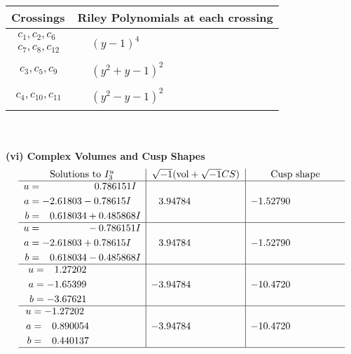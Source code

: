 \documentclass[1p]{elsarticle_modified}
\theoremstyle{definition}
\newcommand{\I}{\sqrt{-1}}
\begin{document}
\begin{tabular}{m{50pt}|m{274pt}}
Crossings & \hspace{64pt}Riley Polynomials at each crossing \\
\hline $$\begin{aligned}c_{1},c_{2},c_{6}\\c_{7},c_{8},c_{12}\end{aligned}$$&$\begin{aligned}
&(y-1)^4
\end{aligned}$\\
\hline $$\begin{aligned}c_{3},c_{5},c_{9}\end{aligned}$$&$\begin{aligned}
&(y^2+y-1)^2
\end{aligned}$\\
\hline $$\begin{aligned}c_{4},c_{10},c_{11}\end{aligned}$$&$\begin{aligned}
&(y^2- y-1)^2
\end{aligned}$\\
\hline
\end{tabular}\\~\\
\newpage\flushleft \textbf{(vi) Complex Volumes and Cusp Shapes}
$$\begin{array}{c|c|c}  
\text{Solutions to }I^u_{3}& \I (\text{vol} + \sqrt{-1}CS) & \text{Cusp shape}\\
 \hline 
\begin{aligned}
u &= \phantom{-0.000000 -}0.786151 I \\
a &= -2.61803 - 0.78615 I \\
b &= \phantom{-}0.618034 + 0.485868 I\end{aligned}
 & \phantom{-}3.94784\phantom{ +0.000000I} & -1.52790\phantom{ +0.000000I} \\ \hline\begin{aligned}
u &= \phantom{-0.000000 } -0.786151 I \\
a &= -2.61803 + 0.78615 I \\
b &= \phantom{-}0.618034 - 0.485868 I\end{aligned}
 & \phantom{-}3.94784\phantom{ +0.000000I} & -1.52790\phantom{ +0.000000I} \\ \hline\begin{aligned}
u &= \phantom{-}1.27202\phantom{ +0.000000I} \\
a &= -1.65399\phantom{ +0.000000I} \\
b &= -3.67621\phantom{ +0.000000I}\end{aligned}
 & -3.94784\phantom{ +0.000000I} & -10.4720\phantom{ +0.000000I} \\ \hline\begin{aligned}
u &= -1.27202\phantom{ +0.000000I} \\
a &= \phantom{-}0.890054\phantom{ +0.000000I} \\
b &= \phantom{-}0.440137\phantom{ +0.000000I}\end{aligned}
 & -3.94784\phantom{ +0.000000I} & -10.4720\phantom{ +0.000000I}\\
 \hline 
 \end{array}$$\newpage\newpage\renewcommand{\arraystretch}{1}
\end{document}
